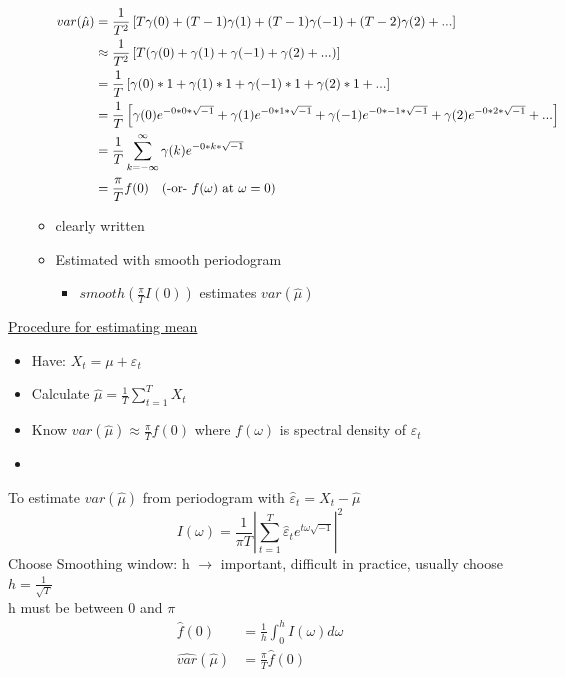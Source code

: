\begin{itemize}
\begin{itemize}
\begin{align*}
            var(\hat{\mu}) &= \frac{1}{T^2} \left[T\gamma(0) + (T-1)\gamma(1) + (T-1)\gamma(-1) + (T-2)\gamma(2) + ... \right]\\
            &\approx \frac{1}{T^2} \left[T(\gamma(0)+ \gamma(1)+\gamma(-1)+\gamma(2)+...) \right]\\
            &= \frac{1}{T} \left[\gamma(0)*1 + \gamma(1)*1+\gamma(-1)*1+\gamma(2)*1 +...\right] \\
            &= \frac{1}{T} \left[\gamma(0)e^{-0*0*\sqrt{-1}} + \gamma(1) e^{-0*1*\sqrt{-1}} + \gamma(-1) e^{-0*-1*\sqrt{-1}} + \gamma(2) e^{-0*2*\sqrt{-1}}+... \right] \\
            &=\frac{1}{T} \sum_{k=-\infty}^\infty \gamma(k) e^{-0*k*\sqrt{-1}} \\
            &= \frac{\pi}{T} f(0) \text{\quad (-or- $f(\omega)$ at $\omega=0$)} \\
        \end{align*}
        \item[]  clearly written
        \item Estimated with smooth periodogram
        \begin{itemize}
            \item[] $smooth(\frac{\pi}{T} I(0))$ estimates $var(\hat{\mu})$
        \end{itemize}
    \end{itemize}
\end{itemize}

\underline{Procedure for estimating mean}
\begin{itemize}
    \item Have: $X_t = \mu + \varepsilon_t$
    \item Calculate $\hat{\mu} = \frac{1}{T} \sum_{t=1}^T X_t$
    \item Know $var(\hat{\mu}) \approx \frac{\pi}{T} f(0)$ where $f(\omega)$ is spectral density of $\varepsilon_t$
    \item 
\end{itemize}
To estimate $var(\hat{\mu})$ from periodogram with $\hat{\varepsilon}_t=X_t-\hat{\mu}$ \[I(\omega)=\frac{1}{\pi T} \left| \sum_{t=1}^T \hat{\varepsilon}_t e^{t\omega \sqrt{-1}} \right|^2 \]
Choose Smoothing window: h $\rightarrow$ important, difficult in practice, usually choose $h=\frac{1}{\sqrt{T}}$\\

\quad h must be between $0$ and $\pi$
\begin{align*}
    \hat{f}(0) &= \frac{1}{h} \int_0^h I(\omega)d\omega \\
    \hat{var}(\hat{\mu}) &= \frac{\pi}{T}\hat{f}(0)
\end{align*}


